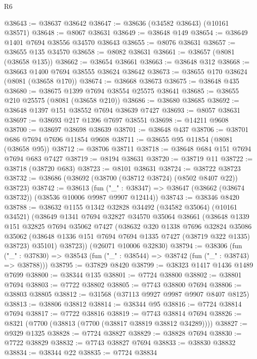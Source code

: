 \begin{lexlean}{R6}
\begin{coremodule}
@38643 := @38637 @38642
@38647 := @38636 (@34582 @38643) (@10161 @38571)
@38648 := @8067 @38631
@38649 := @38648 @149
@38654 := @38649 @1401 @7694 @38556 @34570 @38643
@38655 := @8076 @38631
@38657 := @38655 @135 @34570
@38658 := @8082 @38631
@38661 := @38657 (@8081 (@38658 @135))
@38662 := @38654 @38661
@38663 := @38648 @312
@38668 := @38663 @1400 @7694 @38555 @38624 @38642
@38673 := @38655 @170 @38624 (@8081 (@38658 @170))
@38674 := @38668 @38673
@38675 := @38648 @435
@38680 := @38675 @1399 @7694 @38554 @25575 @38641
@38685 := @38655 @210 @25575 (@8081 (@38658 @210))
@38686 := @38680 @38685
@38692 := @38648 @1397 @151 @38552 @7694 @38639 @7427
@38693 := @8057 @38631
@38697 := @38693 @217 @1396 @7697 @38551
@38698 := @14211 @9608
@38700 := @38697 @38698 @38639
@38701 := @38648 @437
@38706 := @38701 @686 @7694 @7696 @11854 @9608
@38711 := @38655 @95 @11854 (@8081 (@38658 @95))
@38712 := @38706 @38711
@38718 := @38648 @684 @151 @7694 @7694 @683 @7427
@38719 := @8194 @38631
@38720 := @38719 @11
@38722 := @38718 (@38720 @683)
@38723 := @8101 @38631
@38724 := @38722 @38723
@38732 := @38686 (@38692 (@38700 (@38712 @38724) (@8502 @8407 @22)) @38723)
@38742 := @38613
    (fun ("_" : @38347) => @38647 (@38662 (@38674 @38732)) (@38536 @10006 @9987 @9907 @12414))
@38743 := @38346 @8420
@38788 := @38632
    @1155
    @1342
    @32828
    @34492
    (@34582 @35064)
    (@10161 @34521)
    (@38649
      @1341
      @7694
      @32827
      @34570
      @35064
      @38661
      (@38648
        @1339
        @151
        @32825
        @7694
        @35062
        @7427
        (@38632
          @320
          @1338
          @7696
          @32824
          @35086
          @35062
          (@38648 @1336 @151 @7694 @7694 @1335 @7427 (@38719 @322 @1335) @38723)
          @35101)
        @38723))
    (@26071 @10006 @32830)
@38794 := @38306
    (fun ("_" : @37830) => @38543 (fun ("_" : @38544) => @38742 (fun ("_" : @38743) => @38788)))
@38795 := @37829 @8420
@38799 := @38323 @1417 @1436 @1489 @7699
@38800 := @38344 @135
@38801 := @7724 @38800
@38802 := @38801 @7694
@38803 := @7722 @38802
@38805 := @7743 @38800 @7694
@38806 := @38803 @38805
@38812 := @31568 (@37113 @9927 @9987 @9907 @8407 @8125)
@38813 := @38806 @38812
@38814 := @38344 @95
@38816 := @7724 @38814 @7694
@38817 := @7722 @38816
@38819 := @7743 @38814 @7694
@38826 := @8321 (@7700 (@38813 (@7700 (@38817 @38819 @38812 @34289))))
@38827 := @9329 @1325
@38828 := @7724 @38827
@38829 := @38828 @7694
@38830 := @7722 @38829
@38832 := @7743 @38827 @7694
@38833 := @38830 @38832
@38834 := @38344 @22
@38835 := @7724 @38834

\end{coremodule}
\end{lexlean}

